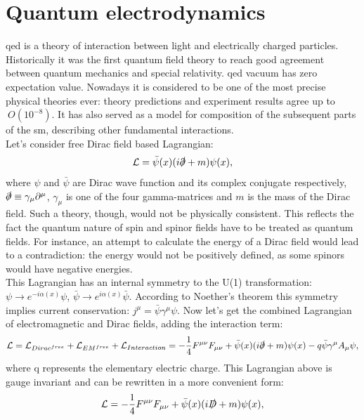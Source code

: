 \section{Quantum electrodynamics}
\label{sec::qed}
\gls{qed} is a theory of interaction between light and electrically charged particles. Historically it was the first quantum field theory to reach good agreement between quantum mechanics and special relativity. \gls{qed} vacuum has zero expectation value.  Nowadays it is considered to be one of the most precise physical theories ever: theory predictions and experiment results agree up to $~O(10^{-8})$. It has also served as a model for composition of the subsequent parts of the \gls{sm}, describing other fundamental interactions.\\
Let's consider free Dirac field based Lagrangian:
 \begin{equation}
\mathcal{L} = \bar \psi(x) (i\slashed\partial +m)\psi(x),
\end{equation}
where $\psi$ and $\bar \psi$ are Dirac wave function and its complex conjugate respectively, $\slashed\partial \equiv \gamma_{\mu}\partial^{\mu}$, \: $\gamma_{\mu}$ is one of the four gamma-matrices and $m$ is the mass of the Dirac field. 
Such a theory, though, would not be physically consistent. This reflects the fact the quantum nature of spin and spinor fields have to be treated as quantum fields. For instance, an attempt to calculate the energy of a Dirac field would lead to a contradiction: the energy would not be positively defined, as some spinors would have negative energies. \\
This Lagrangian has an internal symmetry to the U(1) transformation: $\psi\rightarrow e^{-i\alpha(x)}\psi$, \: $\bar\psi\rightarrow e^{i\alpha(x)}\bar\psi$. According to Noether's theorem this symmetry implies current conservation: $j^{\mu}=\bar\psi\gamma^{\mu}\psi$.
Now let's get the combined Lagrangian of electromagnetic and Dirac fields, adding the interaction term:
 \begin{equation}
\mathcal{L} = \mathcal{L}_{Dirac^{free}} + \mathcal{L}_{EM^{free}} + \mathcal{L}_{Interaction} = -\frac{1}{4} F^{\mu \nu}F_{\mu \nu}+\bar \psi(x) (i\slashed\partial +m)\psi(x) - q\bar\psi\gamma^{\mu}A_{\mu}\psi,
\end{equation}
where q represents the elementary electric charge. This Lagrangian above is gauge invariant and can be rewritten in a more convenient form:
 \begin{equation}
\mathcal{L} =  -\frac{1}{4} F^{\mu \nu}F_{\mu \nu}+\bar \psi(x) (i\slashed D +m)\psi(x),
\end{equation}

